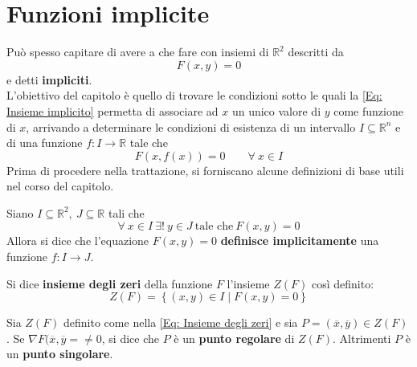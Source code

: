 \chapter{Funzioni implicite}
Può spesso capitare di avere a che fare con insiemi di $\mathbb{R}^2$ descritti da
\begin{equation} \label{Eq: Insieme implicito}
    F(x,y)=0 
\end{equation}
e detti \textbf{impliciti}.\\
L'obiettivo del capitolo è quello di trovare le condizioni sotto le quali la \eqref{Eq: Insieme implicito} permetta di associare ad $x$ un unico valore di $y$ come funzione di $x$,  arrivando a determinare le condizioni di esistenza di un intervallo $I \subseteq \mathbb{R}^n$ e di una funzione $f: I \to \mathbb{R}$ tale che
\begin{equation} \label{Eq: Scopo capitolo 3}
    F(x, f(x))=0 \qquad \forall\ x \in I
\end{equation}
Prima di procedere nella trattazione, si forniscano alcune definizioni di base utili nel corso del capitolo.
\begin{definition} \label{Def: Funzione implicita}
    Siano $I \subseteq \mathbb{R}^2,\ J \subseteq \mathbb{R}$ tali che
    \begin{equation}
        \forall\ x\in I\ \exists!\ y \in J\ \text{tale che}\ F(x,y)=0
    \end{equation}
    Allora si dice che l'equazione $F(x,y)=0$ \textbf{definisce implicitamente} una funzione $f: I \to J$.
\end{definition}
\begin{definition} \label{Def: Insieme degli zeri}
    Si dice \textbf{insieme degli zeri} della funzione $F$ l'insieme $Z(F)$ così definito:
    \begin{equation} \label{Eq: Insieme degli zeri}
        Z(F)=\left\{(x,y) \in I \mid F(x, y)=0 \right\}
    \end{equation}
\end{definition}
\begin{definition}
    Sia $Z(F)$ definito come nella \eqref{Eq: Insieme degli zeri} e sia $P=(\overline{x}, \overline{y}) \in Z(F)$. Se $\nabla F(\overline{x}, \overline{y}= \neq 0$, si dice che $P$ è un \textbf{punto regolare} di $Z(F)$. Altrimenti $P$ è un \textbf{punto singolare}.
\end{definition}

